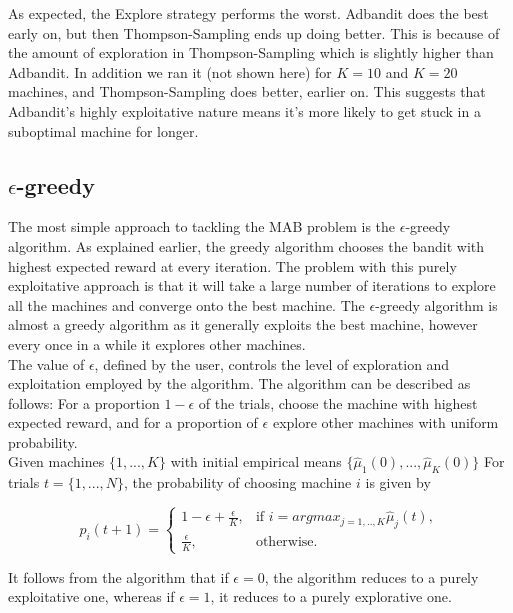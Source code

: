 \documentclass{article}
\begin{document}
As expected, the Explore strategy performs the worst. Adbandit does the best early on, but then Thompson-Sampling ends up doing better. This is because of the amount of exploration in Thompson-Sampling which is slightly higher than Adbandit. In addition we ran it (not shown here) for $K=10$ and $K=20$ machines, and Thompson-Sampling does better, earlier on. This suggests that Adbandit's highly exploitative nature means it's more likely to get stuck in a suboptimal machine for longer.

\subsection{$\epsilon$-greedy}

The most simple approach to tackling the MAB problem is the $\epsilon$-greedy algorithm. As explained earlier, the greedy algorithm chooses the bandit with highest expected reward at every iteration. The problem with this purely exploitative approach is that it will take a large number of iterations to explore all the machines and converge onto the best machine. The $\epsilon$-greedy algorithm is almost a greedy algorithm as it generally exploits the best machine, however every once in a while it explores other machines.\\ 

The value of $\epsilon$, defined by the user, controls the level of exploration and exploitation employed by the algorithm. The algorithm can be described as follows: For a proportion $1 - \epsilon$ of the trials, choose the machine with highest expected reward, and for a proportion of $\epsilon$ explore other machines with uniform probability.\\

Given machines $\{1,...,K\}$ with initial empirical means $\{\hat{\mu}_1(0),...,\hat{\mu}_K(0)\}$ For trials $t = \{1,...,N\}$, the probability of choosing machine $i$ is given by

$$p_i(t+1) = \begin{cases}
  1- \epsilon + \frac{\epsilon}{K}, & \text{if } i = argmax_{j=1,..,K}\hat{\mu}_j(t), \\
  \frac{\epsilon}{K}, & \text{otherwise}.
\end{cases}$$


It follows from the algorithm that if $\epsilon = 0$, the algorithm reduces to a purely exploitative one, whereas if $\epsilon = 1$, it reduces to a purely explorative one. \\
\end{document}
